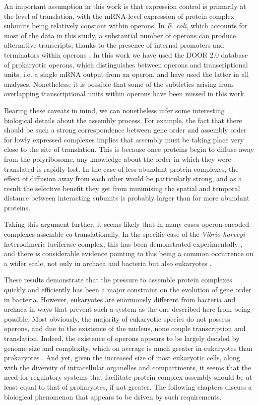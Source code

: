 \documentclass[a4paper,11pt,twoside,openright]{scrbook}
\begin{document}
An important assumption in this work is that expression control is primarily at the level of translation, with the mRNA-level expression of protein complex subunits being relatively constant within operons. In \textit{E. coli}, which accounts for most of the data in this study, a substantial number of operons can produce alternative transcripts, thanks to the presence of internal promoters and terminators within operons \cite{Conway2014}. In this work we have used the DOOR 2.0 database of prokaryotic operons, which distinguishes between operons and transcriptional units, i.e. a single mRNA output from an operon, and have used the latter in all analyses. Nonetheless, it is possible that some of the subtleties arising from overlapping transcriptional units within operons have been missed in this work.

Bearing these caveats in mind, we can nonetheless infer some interesting biological details about the assembly process. For example, the fact that there should be such a strong correspondence between gene order and assembly order for lowly expressed complexes implies that assembly must be taking place very close to the site of translation. This is because once proteins begin to diffuse away from the polyribosome, any knowledge about the order in which they were translated is rapidly lost. In the case of less abundant protein complexes, the effect of diffusion away from each other would be particularly strong, and as a result the selective benefit they get from minimising the spatial and temporal distance between interacting subunits is probably larger than for more abundant proteins.

Taking this argument further, it seems likely that in many cases operon-encoded complexes assemble co-translationally. In the specific case of the \textit{Vibrio harveyi} heterodimeric luciferase complex, this has been demonstrated experimentally \cite{Shieh2015a}, and there is considerable evidence pointing to this being a common occurrence on a wider scale, not only in archaea and bacteria but also eukaryotes \cite{Duncan2011,Wells2015,Natan2017}.

These results demonstrate that the pressure to assemble protein complexes quickly and efficiently has been a major constraint on the evolution of gene order in bacteria. However, eukaryotes are enormously different from bacteria and archaea in ways that prevent such a system as the one described here from being possible. Most obviously, the majority of eukaryotic species do not possess operons, and due to the existence of the nucleus, none couple transcription and translation. Indeed, the existence of operons appears to be largely decided by genome size and complexity, which on average is much greater in eukaryotes than prokaryotes \cite{Nunez2013}. And yet, given the increased size of most eukaryotic cells, along with the diversity of intracellular organelles and compartments, it seems that the need for regulatory systems that facilitate protein complex assembly should be at least equal to that of prokaryotes, if not greater. The following chapters discuss a biological phenomenon that appears to be driven by such requirements.

\end{document}
